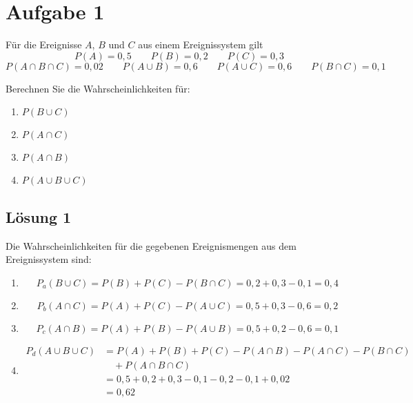 \documentclass[main.tex]{subfiles}
\begin{document}
\section{Aufgabe 1}
Für die Ereignisse $A$, $B$ und $C$ aus einem Ereignissystem gilt
$$
P(A) = 0,5 \qquad
P(B) = 0,2 \qquad
P(C) = 0,3
$$
$$
P(A\cap B\cap C) = 0,02 \qquad
P(A\cup B) = 0,6 \qquad
P(A\cup C) = 0,6 \qquad
P(B\cap C) = 0,1
$$

Berechnen Sie die Wahrscheinlichkeiten für:
\begin{enumerate}
    \item $P(B\cup C)$
    \item $P(A\cap C)$
    \item $P(A\cap B)$
    \item $P(A\cup B \cup C)$
\end{enumerate}

\subsection{Lösung 1}
Die Wahrscheinlichkeiten für die gegebenen Ereignismengen aus dem Ereignissystem sind:
\begin{enumerate}
    \item $$
        P_a(B\cup C) = P(B) + P(C) - P(B\cap C) = 0,2 + 0,3 - 0,1 = 0,4
    $$
    \item $$
        P_b(A\cap C) = P(A) + P(C) - P(A\cup C) = 0,5 + 0,3 - 0,6 = 0,2
    $$
    \item $$
        P_c(A\cap B) = P(A) + P(B) - P(A\cup B) = 0,5 + 0,2 - 0,6 = 0,1
    $$
    \item $$\begin{aligned}
        P_d(A\cup B \cup C) &= 
        P(A) + P(B) + P(C) - P(A\cap B) - P(A\cap C) - P(B\cap C) \\
        &\quad + P(A\cap B\cap C) \\
        &= 0,5 + 0,2 + 0,3 - 0,1 - 0,2 - 0,1 + 0,02 \\
        &= 0,62
    \end{aligned}$$
\end{enumerate}
\end{document}
